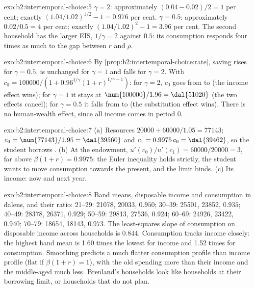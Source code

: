 \begin{solution}{exo:b2:intertemporal-choice:5}
$\gamma = 2$: approximately $(0.04 - 0.02)/2 = 1$ per cent; exactly $(1.04/1.02)^{1/2} - 1 = 0.976$
per cent. $\gamma = 0.5$: approximately $0.02/0.5 = 4$ per cent; exactly $(1.04/1.02)^{2} - 1 = 3.96$
per cent. The second household has the larger EIS, $1/\gamma = 2$ against $0.5$: its consumption
responds four times as much to the gap between $r$ and $\rho$.
\end{solution}

\begin{solution}{exo:b2:intertemporal-choice:6}
By \cref{prop:b2:intertemporal-choice:rate}, saving rises for $\gamma = 0.5$, is unchanged for $\gamma =
1$ and falls for $\gamma = 2$. With $c_0 = \num{100000}/(1 + 0.96^{1/\gamma}(1 + r)^{1/\gamma - 1})$:
for $\gamma = 2$, $c_0$ goes from  to  (the income effect wins); for $\gamma = 1$
it stays at $\num{100000}/1.96 = \dal{51020}$ (the two effects cancel); for $\gamma = 0.5$ it falls from
 to  (the substitution effect wins). There is no human-wealth effect, since all
income comes in period 0.
\end{solution}

\begin{solution}{exo:b2:intertemporal-choice:7}
(a) Resources $\num{20000} + \num{60000}/1.05 = \num{77143}$; $c_0 = \num{77143}/1.95 = \dal{39560}$
and $c_1 = 0.9975\,c_0 = \dal{39462}$, so the student borrows .
(b) At the endowment, $u'(c_0)/u'(c_1) = \num{60000}/\num{20000} = 3$, far above $\beta(1 + r) = 0.9975$: the Euler
inequality holds strictly, the student wants to move consumption towards the present, and the limit
binds. (c) Its income:  now and  next year.
\end{solution}

\begin{solution}{exo:b2:intertemporal-choice:8}
Band means, disposable income and consumption in dalens, and their ratio: 21--29: \num{21078},
\num{20033}, $0.950$; 30--39: \num{25501}, \num{23852}, $0.935$; 40--49: \num{28378}, \num{26371},
$0.929$; 50--59: \num{29813}, \num{27536}, $0.924$; 60--69: \num{24926}, \num{23422}, $0.940$;
70--79: \num{18654}, \num{18143}, $0.973$. The least-squares slope of consumption on disposable
income across households is $0.844$. Consumption tracks income closely: the highest band mean is 1.60
times the lowest for income and 1.52 times for consumption. Smoothing predicts a much flatter
consumption profile than income profile (flat if $\beta(1 + r) = 1$), with the old spending more than
their income and the middle-aged much less. Brenland's households look like households at their
borrowing limit, or households that do not plan.
\end{solution}

